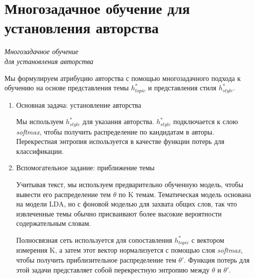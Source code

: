 \section{Многозадачное обучение для установления авторства}
\begin{center}
\emph{Многозадачное обучение}\\
\emph{для установления авторства}
\end{center}
\par Мы формулируем атрибуцию авторства 
с помощью многозадачного подхода к обучению на основе представления темы 
$h^{*}_{topic}$ и представления стиля $h^{*}_{style}$.
\begin{enumerate}[label={\arabic*)}, left=10pt]
    \item Основная задача: установление авторства
    \par Мы используем $h^{*}_{style}$ для указания авторства. 
    $h^{*}_{style}$ подключается к слою \textit{softmax}, чтобы получить распределение по кандидатам в авторы. 
    Перекрестная энтропия используется в качестве функции потерь для классификации.
    \item Вспомогательное задание: приближение темы
    \par Учитывая текст, мы используем предварительно обученную модель, 
    чтобы вывести его распределение тем $\theta$ по K темам. 
    Тематическая модель основана на модели 
    LDA, но с фоновой моделью для захвата общих слов, так что извлеченные темы обычно присваивают более высокие вероятности 
    содержательным словам.
    \par Полносвязная сеть используется для сопоставления $h^{*}_{topic}$ с вектором измерения K, 
    а затем этот вектор нормализуется с помощью слоя \textit{softmax}, 
    чтобы получить приблизительное распределение тем $\theta'$. Функция 
    потерь для этой задачи представляет собой перекрестную энтропию между $\theta$ и $\theta'$.
\end {enumerate}
